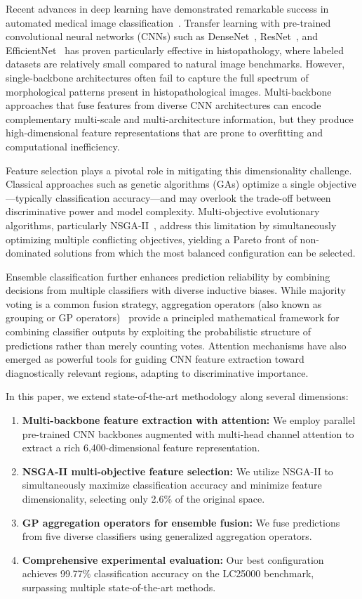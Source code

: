 \documentclass[11pt,a4paper]{article}
\begin{document}
Recent advances in deep learning have demonstrated remarkable success in automated medical image classification~\cite{litjens2017survey}. Transfer learning with pre-trained convolutional neural networks (CNNs) such as DenseNet~\cite{huang2017densely}, ResNet~\cite{he2016deep}, and EfficientNet~\cite{tan2019efficientnet} has proven particularly effective in histopathology, where labeled datasets are relatively small compared to natural image benchmarks. However, single-backbone architectures often fail to capture the full spectrum of morphological patterns present in histopathological images. Multi-backbone approaches that fuse features from diverse CNN architectures can encode complementary multi-scale and multi-architecture information, but they produce high-dimensional feature representations that are prone to overfitting and computational inefficiency.

Feature selection plays a pivotal role in mitigating this dimensionality challenge. Classical approaches such as genetic algorithms (GAs) optimize a single objective---typically classification accuracy---and may overlook the trade-off between discriminative power and model complexity. Multi-objective evolutionary algorithms, particularly NSGA-II~\cite{deb2002fast}, address this limitation by simultaneously optimizing multiple conflicting objectives, yielding a Pareto front of non-dominated solutions from which the most balanced configuration can be selected.

Ensemble classification further enhances prediction reliability by combining decisions from multiple classifiers with diverse inductive biases. While majority voting is a common fusion strategy, aggregation operators (also known as grouping or GP operators)~\cite{beliakov2007aggregation} provide a principled mathematical framework for combining classifier outputs by exploiting the probabilistic structure of predictions rather than merely counting votes. Attention mechanisms have also emerged as powerful tools for guiding CNN feature extraction toward diagnostically relevant regions, adapting to discriminative importance.

In this paper, we extend state-of-the-art methodology along several dimensions:
\begin{enumerate}
    \item \textbf{Multi-backbone feature extraction with attention:} We employ parallel pre-trained CNN backbones augmented with multi-head channel attention to extract a rich 6,400-dimensional feature representation.
    \item \textbf{NSGA-II multi-objective feature selection:} We utilize NSGA-II to simultaneously maximize classification accuracy and minimize feature dimensionality, selecting only 2.6\% of the original space.
    \item \textbf{GP aggregation operators for ensemble fusion:} We fuse predictions from five diverse classifiers using generalized aggregation operators.
    \item \textbf{Comprehensive experimental evaluation:} Our best configuration achieves 99.77\% classification accuracy on the LC25000 benchmark, surpassing multiple state-of-the-art methods.
\end{enumerate}
\end{document}
